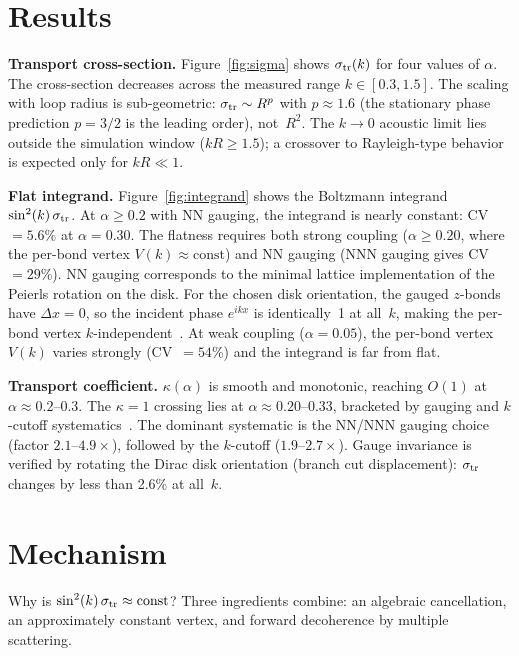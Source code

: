 \documentclass[aps,prl,twocolumn,superscriptaddress]{revtex4-2}
\begin{document}
\section{Results}

\textbf{Transport cross-section.}
Figure~\ref{fig:sigma} shows $\sigma_{\rm tr}(k)$ for four values of
$\alpha$. The cross-section decreases across the measured range
$k \in [0.3, 1.5]$. The scaling with loop radius is sub-geometric:
$\sigma_{\rm tr} \sim R^p$ with $p \approx 1.6$ (the stationary phase
prediction $p = 3/2$ is the leading order), not~$R^2$. The $k \to 0$
acoustic limit lies outside the simulation window ($kR \geq 1.5$); a
crossover to Rayleigh-type behavior is expected only for $kR \ll 1$.

\textbf{Flat integrand.}
Figure~\ref{fig:integrand} shows the Boltzmann integrand
$\sin^2(k)\,\sigma_{\rm tr}$. At $\alpha \geq 0.2$ with NN gauging, the
integrand is nearly constant: CV~$= 5.6\%$ at $\alpha = 0.30$. The flatness
requires both strong coupling ($\alpha \geq 0.20$, where the per-bond vertex
$V(k) \approx \mathrm{const}$) and NN gauging (NNN gauging gives
CV~$= 29\%$). NN gauging corresponds to the minimal lattice implementation of
the Peierls rotation on the disk. For the chosen disk orientation,
the gauged $z$-bonds have $\Delta x = 0$, so the incident phase
$e^{ikx}$ is identically~1 at all~$k$, making the per-bond vertex
$k$-independent~\cite{sm}. At weak
coupling ($\alpha = 0.05$), the per-bond vertex $V(k)$ varies strongly
(CV~$= 54\%$) and the integrand is far from flat.

\textbf{Transport coefficient.}
$\kappa(\alpha)$ is smooth and monotonic, reaching $O(1)$ at
$\alpha \approx 0.2$--$0.3$. The $\kappa = 1$ crossing lies at
$\alpha \approx 0.20$--$0.33$, bracketed by gauging and $k$-cutoff
systematics~\cite{sm}. The dominant systematic is the NN/NNN gauging choice
(factor $2.1$--$4.9\times$), followed by the $k$-cutoff
($1.9$--$2.7\times$). Gauge invariance is verified by rotating the Dirac
disk orientation (branch cut displacement): $\sigma_{\rm tr}$ changes by
less than 2.6\% at all~$k$.

\section{Mechanism}

Why is $\sin^2(k)\,\sigma_{\rm tr} \approx \mathrm{const}$? Three
ingredients combine: an algebraic cancellation, an approximately constant
vertex, and forward decoherence by multiple scattering.
\end{document}
